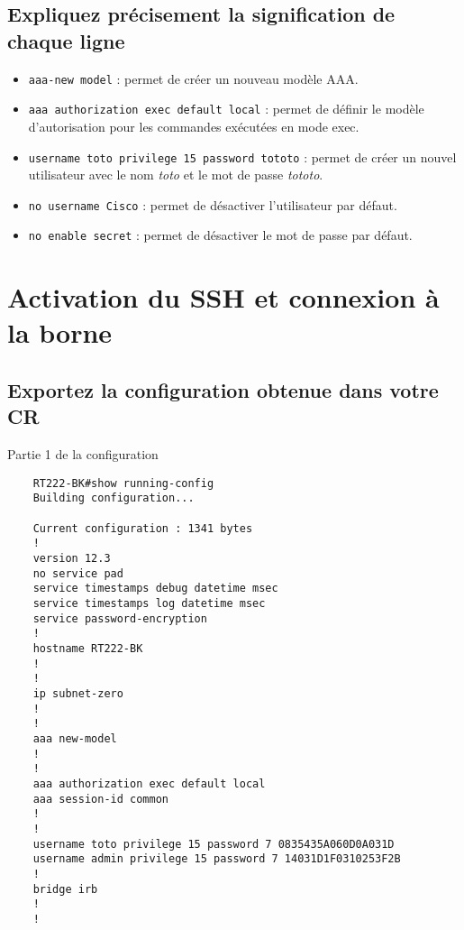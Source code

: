 \documentclass[12pt, a4paper]{article}
\begin{document}
    \subsection{Expliquez précisement la signification de chaque ligne}
    \begin{itemize}
        \item \texttt{aaa-new model} : permet de créer un nouveau modèle AAA.
        \item \texttt{aaa authorization exec default local} : permet de définir le modèle d'autorisation pour les commandes exécutées en mode exec.
        \item \texttt{username toto privilege 15 password tototo} : permet de créer un nouvel utilisateur avec le nom \textit{toto} et le mot de passe \textit{tototo}.
        \item \texttt{no username Cisco} : permet de désactiver l'utilisateur par défaut.
        \item \texttt{no enable secret} : permet de désactiver le mot de passe par défaut.
    \end{itemize}

\section{Activation du SSH et connexion à la borne}
    \subsection{Exportez la configuration obtenue dans votre CR}
    \begin{listing}[H]
        \caption{Partie 1 de la configuration }
        \label{lst:conf}
        \begin{verbatim}
    RT222-BK#show running-config
    Building configuration...

    Current configuration : 1341 bytes
    !
    version 12.3
    no service pad
    service timestamps debug datetime msec
    service timestamps log datetime msec
    service password-encryption
    !
    hostname RT222-BK
    !
    !
    ip subnet-zero
    !
    !
    aaa new-model
    !
    !
    aaa authorization exec default local
    aaa session-id common
    !
    !
    username toto privilege 15 password 7 0835435A060D0A031D
    username admin privilege 15 password 7 14031D1F0310253F2B
    !
    bridge irb
    !
    !
        \end{verbatim}
    \end{listing}
\end{document}

